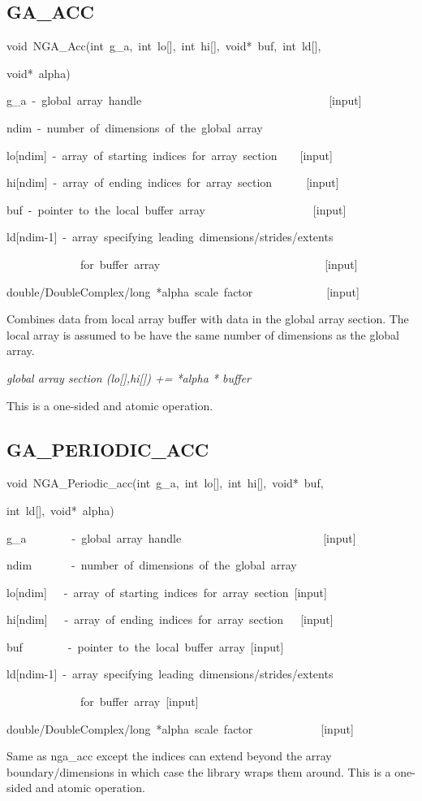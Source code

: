 \subsection*{\label{sub:GA_ACC}GA\_ACC}
\begin{lyxcode}
void~NGA\_Acc(int~g\_a,~int~lo{[}{]},~int~hi{[}{]},~void{*}~buf,~int~ld{[}{]},~

void{*}~alpha)



g\_a~-~global~array~handle~~~~~~~~~~~~~~~~~~~~~~~~~~~~~~~~~{[}input{]}~

ndim~-~number~of~dimensions~of~the~global~array~

lo{[}ndim{]}~-~array~of~starting~indices~for~array~section~~~~{[}input{]}

hi{[}ndim{]}~-~array~of~ending~indices~for~array~section~~~~~~{[}input{]}~

buf~-~pointer~to~the~local~buffer~array~~~~~~~~~~~~~~~~~~~{[}input{]}~

ld{[}ndim-1{]}~-~array~specifying~leading~dimensions/strides/extents~

~~~~~~~~~~~~~for~buffer~array~~~~~~~~~~~~~~~~~~~~~~~~~~~~~{[}input{]}

double/DoubleComplex/long~{*}alpha~scale~factor~~~~~~~~~~~~~{[}input{]}
\end{lyxcode}
Combines data from local array buffer with data in the global array
section. The local array is assumed to be have the same number of
dimensions as the global array.

\emph{global array section (lo{[}{]},hi{[}{]}) += {*}alpha {*} buffer}

This is a one-sided and atomic operation.


\subsection*{\label{sub:GA_PERIODIC_ACC}GA\_PERIODIC\_ACC}
\begin{lyxcode}
void~NGA\_Periodic\_acc(int~g\_a,~int~lo{[}{]},~int~hi{[}{]},~void{*}~buf,

int~ld{[}{]},~void{*}~alpha)



g\_a~~~~~~~~-~global~array~handle~~~~~~~~~~~~~~~~~~~~~~~~~{[}input{]}~

ndim~~~~~~~-~number~of~dimensions~of~the~global~array~

lo{[}ndim{]}~~~-~array~of~starting~indices~for~array~section~{[}input{]}~

hi{[}ndim{]}~~~-~array~of~ending~indices~for~array~section~~~{[}input{]}~

buf~~~~~~~~-~pointer~to~the~local~buffer~array~{[}input{]}~

ld{[}ndim-1{]}~-~array~specifying~leading~dimensions/strides/extents~

~~~~~~~~~~~~~for~buffer~array~{[}input{]}~

double/DoubleComplex/long~{*}alpha~scale~factor~~~~~~~~~~~~{[}input{]}
\end{lyxcode}
Same as nga\_acc except the indices can extend beyond the array boundary/dimensions
in which case the library wraps them around. This is a one-sided and
atomic operation. 



